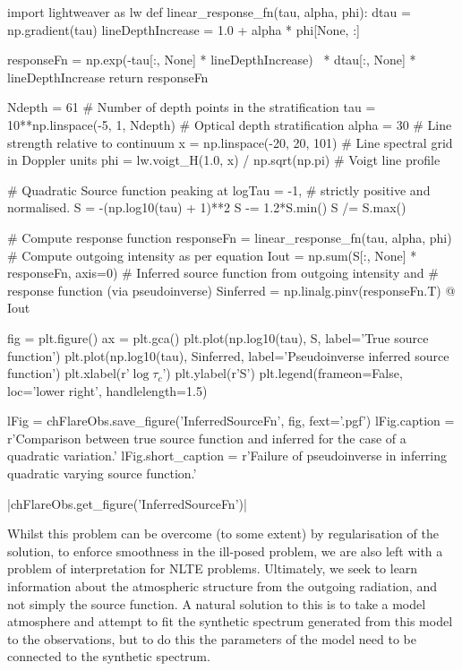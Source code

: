 \begin{pycode}[FlareObs]
import lightweaver as lw
def linear_response_fn(tau, alpha, phi):
    dtau = np.gradient(tau)
    lineDepthIncrease = 1.0 + alpha * phi[None, :]

    responseFn = np.exp(-tau[:, None] * lineDepthIncrease) \
                  * dtau[:, None] * lineDepthIncrease
    return responseFn

Ndepth = 61 # Number of depth points in the stratification
tau = 10**np.linspace(-5, 1, Ndepth) # Optical depth stratification
alpha = 30 # Line strength relative to continuum
x = np.linspace(-20, 20, 101) # Line spectral grid in Doppler units
phi = lw.voigt_H(1.0, x) / np.sqrt(np.pi) # Voigt line profile

# Quadratic Source function peaking at logTau = -1,
# strictly positive and normalised.
S = -(np.log10(tau) + 1)**2
S -= 1.2*S.min()
S /= S.max()

# Compute response function
responseFn = linear_response_fn(tau, alpha, phi)
# Compute outgoing intensity as per equation
Iout = np.sum(S[:, None] * responseFn, axis=0)
# Inferred source function from outgoing intensity and
# response function (via pseudoinverse)
Sinferred = np.linalg.pinv(responseFn.T) @ Iout

fig = plt.figure()
ax = plt.gca()
plt.plot(np.log10(tau), S, label='True source function')
plt.plot(np.log10(tau), Sinferred, label='Pseudoinverse inferred source function')
plt.xlabel(r'$\log\tau_c$')
plt.ylabel(r'S')
plt.legend(frameon=False, loc='lower right', handlelength=1.5)

lFig = chFlareObs.save_figure('InferredSourceFn', fig, fext='.pgf')
lFig.caption = r'Comparison between true source function and inferred for the case of a quadratic variation.'
lFig.short_caption = r'Failure of pseudoinverse in inferring quadratic varying source function.'
\end{pycode}

\py[FlareObs]|chFlareObs.get_figure('InferredSourceFn')|

Whilst this problem can be overcome (to some extent) by regularisation of the solution, to enforce smoothness in the ill-posed problem, we are also left with a problem of interpretation for NLTE problems.
Ultimately, we seek to learn information about the atmospheric structure from the outgoing radiation, and not simply the source function.
A natural solution to this is to take a model atmosphere and attempt to fit the synthetic spectrum generated from this model to the observations, but to do this the parameters of the model need to be connected to the synthetic spectrum.

